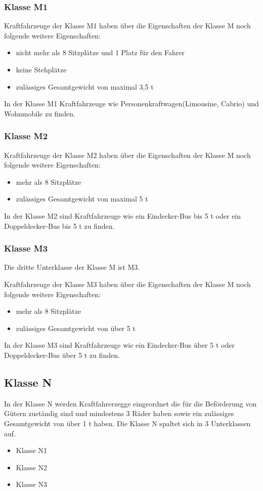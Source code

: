 \subsubsection{Klasse M1}
Kraftfahrzeuge der Klasse M1 haben über die Eigenschaften der Klasse M noch folgende weitere Eigenschaften:
\begin{itemize}
	\item {nicht mehr als 8 Sitzplätze und 1 Platz für den Fahrer}
	\item {keine Stehplätze}
	\item {zulässiges Gesamtgewicht von maximal 3,5 \ac{t}}
\end{itemize}

In der Klasse M1 Kraftfahrzeuge wie Personenkraftwagen(Limousine, Cabrio) und Wohnmobile zu finden.

\subsubsection{Klasse M2}
Kraftfahrzeuge der Klasse M2 haben über die Eigenschaften der Klasse M noch folgende weitere Eigenschaften:
\begin{itemize}
	\item {mehr als 8 Sitzplätze}
	\item {zulässiges Gesamtgewicht von maximal 5 \ac{t}}
\end{itemize}

In der Klasse M2 sind Kraftfahrzeuge wie ein Eindecker-Bus bis 5 \ac{t} oder ein Doppeldecker-Bus bis 5 \ac{t} zu finden.

\subsubsection{Klasse M3}

Die dritte Unterklasse der Klasse M ist M3.

Kraftfahrzeuge der Klasse M3 haben über die Eigenschaften der Klasse M noch folgende weitere Eigenschaften:
\begin{itemize}
	\item {mehr als 8 Sitzplätze}
	\item {zulässiges Gesamtgewicht von über 5 \ac{t}}
\end{itemize}

In der Klasse M3 sind Kraftfahrzeuge wie ein Eindecker-Bus über 5 \ac{t} oder Doppeldecker-Bus über 5 \ac{t} zu finden.

\subsection{Klasse N}
In der Klasse N werden Kraftfahrerzegge eingeordnet die für die Beförderung von Gütern zuständig sind und mindestens 3 Räder haben sowie ein zulässiges Gesamtgewicht von über 1 \ac{t} haben.
Die Klasse N spaltet sich in 3 Unterklassen auf.
\begin{itemize}
	\item {Klasse N1}
	\item {Klasse N2}
	\item {Klasse N3}
\end{itemize}

